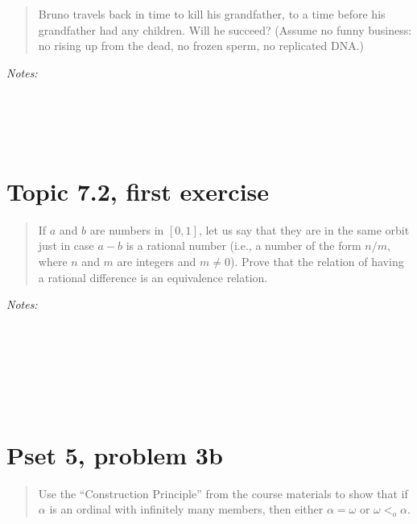 \documentclass[justified]{tufte-handout}
\begin{document}
\begin{quote}Bruno travels back in time to kill his grandfather, to a time before his grandfather had any children. Will he succeed? (Assume no funny business: no rising up from the dead, no frozen sperm, no replicated DNA.)\end{quote}

\noindent \emph{Notes:}  \underline{\hspace{15.4cm}}\\\\\underline{\hspace{16.43cm}}\\\\\underline{\hspace{16.43cm}}\\


\section{Topic 7.2, first exercise}

\begin{quote} If $a$ and $b$ are numbers in $[0,1]$, let us say that they are in the same orbit just in case $a-b$ is a rational number (i.e., a number of the form $n/m$, where $n$ and $m$ are integers and $m\neq 0$). Prove that the relation of having a rational difference is an equivalence relation.\end{quote}

\noindent \emph{Notes:}  \underline{\hspace{15.4cm}}\\\\\underline{\hspace{16.43cm}}\\\\\underline{\hspace{16.43cm}}\\\\\underline{\hspace{16.43cm}}\\

\section{Pset 5, problem 3b}

\begin{quote}Use the ``Construction Principle'' from the course materials to show that if $\alpha$ is an ordinal with infinitely many members, then either $\alpha = \omega$ or $\omega <_o \alpha$.\end{quote}
\end{document}
